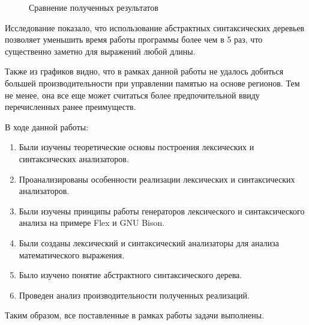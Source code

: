 \documentclass[coursework]{SCWorks}
\begin{document}
\begin{figure}[H]
	\caption{Сравнение полученных результатов}
	\label{pic7}
\end{figure}

Исследование показало, что использование абстрактных синтаксических деревьев позволяет уменьшить время работы программы более чем в 5 раз, что существенно заметно для выражений любой длины.

Также из графиков видно, что в рамках данной работы не удалось добиться большей производительности при управлении памятью на основе регионов. Тем не менее, она все еще может считаться более предпочительной ввиду перечисленных ранее преимуществ.


\conclusion
В ходе данной работы:

\begin{enumerate}
	\item Были изучены теоретические основы построения лексических и синтаксических анализаторов.
	\item Проанализированы особенности реализации лексических и синтаксических анализаторов.
	\item Были изучены принципы работы генераторов лексического и синтаксического анализа на примере Flex и GNU Bison.
	\item Были созданы лексический и синтаксический анализаторы для анализа математического выражения.
	\item Было изучено понятие абстрактного синтаксического дерева.
	\item Проведен анализ производительности полученных реализаций.
\end{enumerate}

Таким образом, все поставленные в рамках работы задачи выполнены.
\end{document}
